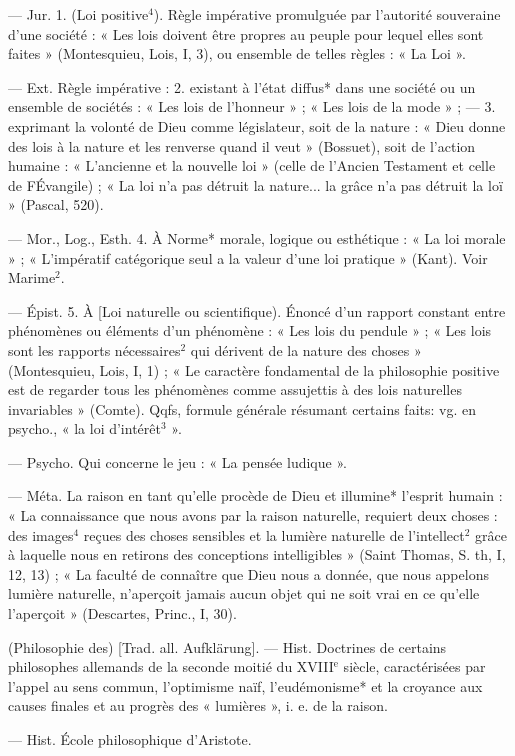 \begin{itemize}[leftmargin=1cm, label=, itemsep=1pt]
 — Jur. 1. (Loi positive$^4$). Règle
impérative promulguée par l'autorité souveraine d’une société : « Les
lois doivent être propres au peuple
pour lequel elles sont faites » (Montesquieu, Lois, I, 3), ou ensemble de
telles règles : « La Loi ».

— Ext. Règle impérative : 2. existant à l’état diffus* dans une société
ou un ensemble de sociétés : « Les
lois de l'honneur » ; « Les lois de la
mode » ; — 3. exprimant la volonté
de Dieu comme législateur, soit de
la nature : « Dieu donne des lois à la
nature et les renverse quand il veut »
(Bossuet), soit de l'action humaine :
« L'ancienne et la nouvelle loi »
(celle de l'Ancien Testament et celle
de FÉvangile) ; « La loi n'a pas détruit la nature... la grâce n’a pas
détruit la loï » (Pascal, 520).

— Mor., Log., Esth. 4. À Norme*
morale, logique ou esthétique : « La
loi morale » ; « L'impératif catégorique seul a la valeur d’une loi pratique » (Kant). Voir Marime$^2$.

— Épist. 5. À [Loi naturelle ou
scientifique). Énoncé d'un rapport
constant entre phénomènes ou éléments d’un phénomène : « Les lois
du pendule » ; « Les lois sont les rapports nécessaires$^2$ qui dérivent de la
nature des choses » (Montesquieu,
Lois, I, 1) ; « Le caractère fondamental de la philosophie positive
est de regarder tous les phénomènes
comme assujettis à des lois naturelles invariables » (Comte). Qqfs,
formule générale résumant certains
faits: vg. en psycho., « la loi d’intérêt$^3$ ».

 — Psycho. Qui concerne le
jeu : « La pensée ludique ».

 — Méta. La raison
en tant qu’elle procède de Dieu et
illumine* l'esprit humain : « La
connaissance que nous avons par la
raison naturelle, requiert deux
choses : des images$^4$ reçues des
choses sensibles et la lumière naturelle de l’intellect$^2$ grâce à laquelle
nous en retirons des conceptions
intelligibles » (Saint Thomas, S. th,
I, 12, 13) ; « La faculté de connaître
que Dieu nous a donnée, que nous
appelons lumière naturelle, n'aperçoit jamais aucun objet qui ne soit
vrai en ce qu’elle l'aperçoit » (Descartes, Princ., I, 30).

 (Philosophie des) [Trad.
all. Aufklärung]. — Hist. Doctrines
de certains philosophes allemands de
la seconde moitié du {\footnotesize XVIII}$^\text{e}$ siècle,
caractérisées par l'appel au sens
commun, l'optimisme naïf, l’eudémonisme* et la croyance aux causes
finales et au progrès des « lumières »,
i. e. de la raison.

 — Hist. École philosophique
d’Aristote.

	\end{itemize}
